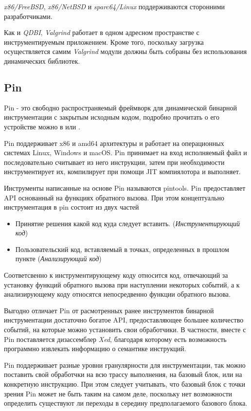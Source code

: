 \emph{x86/FreeBSD}, \emph{x86/NetBSD} и \emph{sparc64/Linux} поддерживаются сторонними разработчиками.

Как и \emph{QDBI}, \emph{Valgrind} работает в одном адресном пространстве с инструментируемым приложением. Кроме того, поскольку загрузка осуществляется самим \emph{Valgrind} модули должны быть собраны без использования динамических библиотек.

\subsection{Pin}

Pin - это свободно распространяемый фреймворк для динамической бинарной инструментации с закрытым исходным кодом, подробно прочитать о его устройстве можно в \cite{PIN} или \cite{PBA}.

Pin поддерживает x86 и amd64 архитектуры и работает на операционных системах Linux, Windows и macOS. Pin принимает на вход исполняемый файл и последовательно считывает из него инструкции, затем при необходимости инструментирует их, компилирует при помощи JIT компиялотора и выполняет.

Инструменты написанные на основе Pin называются pintools. Pin предоставляет API основанный на функциях обратного вызова. При этом концептуально инструментация в pin состоит из двух частей

\begin{itemize}
    \item Принятие решения какой код куда следует вставить. (\emph{Инструментирующий код})
    \item Пользовательский код, вставляемый в точках, определенных в прошлом пункте (\emph{Анализирующий код})
\end{itemize}

Соответсвенно к инструментирующему коду относится код, отвечающий за установку функций обратного вызова при наступлении некоторых событий, а к анализирующему коду относятся непосредвенно функции обратного вызова.

Выгодно отличает Pin от расмотренных ранее инструментов бинарной инструментации достаточно богатое API, предоставляющее большее количество событий, на которые можно установить свои обработчики. В частности, вместе с Pin поставляется дизассемблер \emph{Xed}, благодаря которому есть возможность программно извлекать информацию о семантике инструкций.

Pin поддерживает разные уровни гранулярности для инструментации, так можно поставить свой обработчки на всю трассу выполнения, на базовый блок, или на конкретную инструкцию. При этом следует учитывать, что базовый блок с точки зрения Pin может не быть таким на самом деле, поскольку нет возможности определить существуют ли переходы в середину предполагаемого базового блока.

